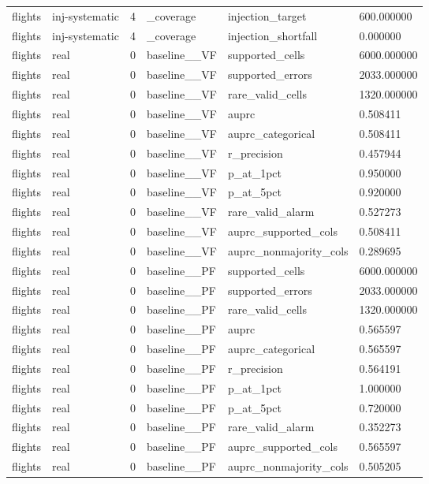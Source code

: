 \begin{tabular}{llllll}
flights & inj-systematic & 4 & \_coverage & injection\_target & 600.000000 \\
flights & inj-systematic & 4 & \_coverage & injection\_shortfall & 0.000000 \\
flights & real & 0 & baseline\_\_VF & supported\_cells & 6000.000000 \\
flights & real & 0 & baseline\_\_VF & supported\_errors & 2033.000000 \\
flights & real & 0 & baseline\_\_VF & rare\_valid\_cells & 1320.000000 \\
flights & real & 0 & baseline\_\_VF & auprc & 0.508411 \\
flights & real & 0 & baseline\_\_VF & auprc\_categorical & 0.508411 \\
flights & real & 0 & baseline\_\_VF & r\_precision & 0.457944 \\
flights & real & 0 & baseline\_\_VF & p\_at\_1pct & 0.950000 \\
flights & real & 0 & baseline\_\_VF & p\_at\_5pct & 0.920000 \\
flights & real & 0 & baseline\_\_VF & rare\_valid\_alarm & 0.527273 \\
flights & real & 0 & baseline\_\_VF & auprc\_supported\_cols & 0.508411 \\
flights & real & 0 & baseline\_\_VF & auprc\_nonmajority\_cols & 0.289695 \\
flights & real & 0 & baseline\_\_PF & supported\_cells & 6000.000000 \\
flights & real & 0 & baseline\_\_PF & supported\_errors & 2033.000000 \\
flights & real & 0 & baseline\_\_PF & rare\_valid\_cells & 1320.000000 \\
flights & real & 0 & baseline\_\_PF & auprc & 0.565597 \\
flights & real & 0 & baseline\_\_PF & auprc\_categorical & 0.565597 \\
flights & real & 0 & baseline\_\_PF & r\_precision & 0.564191 \\
flights & real & 0 & baseline\_\_PF & p\_at\_1pct & 1.000000 \\
flights & real & 0 & baseline\_\_PF & p\_at\_5pct & 0.720000 \\
flights & real & 0 & baseline\_\_PF & rare\_valid\_alarm & 0.352273 \\
flights & real & 0 & baseline\_\_PF & auprc\_supported\_cols & 0.565597 \\
flights & real & 0 & baseline\_\_PF & auprc\_nonmajority\_cols & 0.505205 \\

\end{tabular}

